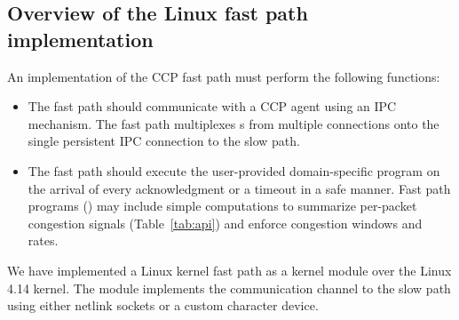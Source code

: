 \subsection{Overview of the Linux fast path implementation}
\label{sec:implementation-basics}

An implementation of the CCP fast path must perform the following functions:
\begin{itemize}
\item The fast path should communicate with a \userspace CCP agent using an IPC
  mechanism. The fast path multiplexes s from multiple connections
  onto the single persistent IPC connection to the slow path.
\item The fast path should execute the user-provided domain-specific program on
  the arrival of every acknowledgment or a timeout in a safe manner. Fast path
  programs () may include simple computations to summarize
  per-packet congestion signals (Table~\ref{tab:api}) and enforce congestion
  windows and rates.
\end{itemize}

We have implemented a Linux kernel fast path as a kernel
module over the Linux 4.14 kernel. The module
implements the communication channel to the slow path using either netlink sockets or a custom
character device.

